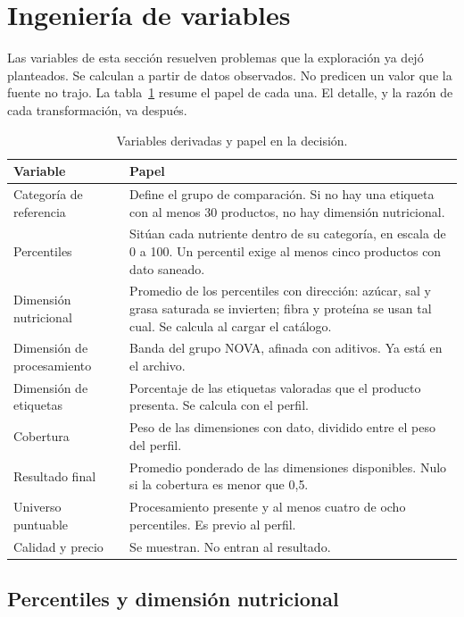 \section{Ingeniería de variables}

Las variables de esta sección resuelven problemas que la exploración ya dejó planteados. Se calculan a partir de datos observados. No predicen un valor que la fuente no trajo. La tabla~\ref{tab:variables} resume el papel de cada una. El detalle, y la razón de cada transformación, va después.

\begin{table}[ht]
  \centering
  \caption{Variables derivadas y papel en la decisión.}
  \label{tab:variables}
  \small
  \begin{tabularx}{\textwidth}{lX}
    \toprule
    Variable & Papel \\
    \midrule
    Categoría de referencia & Define el grupo de comparación. Si no hay una etiqueta con al menos 30 productos, no hay dimensión nutricional. \\
    Percentiles & Sitúan cada nutriente dentro de su categoría, en escala de 0 a 100. Un percentil exige al menos cinco productos con dato saneado. \\
    Dimensión nutricional & Promedio de los percentiles con dirección: azúcar, sal y grasa saturada se invierten; fibra y proteína se usan tal cual. Se calcula al cargar el catálogo. \\
    Dimensión de procesamiento & Banda del grupo NOVA, afinada con aditivos. Ya está en el archivo. \\
    Dimensión de etiquetas & Porcentaje de las etiquetas valoradas que el producto presenta. Se calcula con el perfil. \\
    Cobertura & Peso de las dimensiones con dato, dividido entre el peso del perfil. \\
    Resultado final & Promedio ponderado de las dimensiones disponibles. Nulo si la cobertura es menor que 0{,}5. \\
    Universo puntuable & Procesamiento presente y al menos cuatro de ocho percentiles. Es previo al perfil. \\
    Calidad y precio & Se muestran. No entran al resultado. \\
    \bottomrule
  \end{tabularx}
\end{table}

\subsection{Percentiles y dimensión nutricional}


